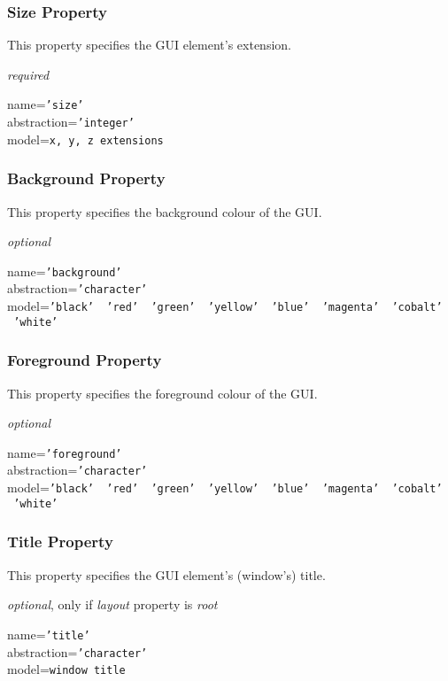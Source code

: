 \subsubsection{Size Property}

This property specifies the GUI element's extension.

\emph{required}

name=\texttt{'size'}\\
abstraction=\texttt{'integer'}\\
model=\texttt{x, y, z extensions}

\subsubsection{Background Property}

This property specifies the background colour of the GUI.

\emph{optional}

name=\texttt{'background'}\\
abstraction=\texttt{'character'}\\
model=\texttt{'black' \vline\ 'red' \vline\ 'green' \vline\ 'yellow' \vline\ 'blue' \vline\ 'magenta' \vline\ 'cobalt' \vline\ 'white'}

\subsubsection{Foreground Property}

This property specifies the foreground colour of the GUI.

\emph{optional}

name=\texttt{'foreground'}\\
abstraction=\texttt{'character'}\\
model=\texttt{'black' \vline\ 'red' \vline\ 'green' \vline\ 'yellow' \vline\ 'blue' \vline\ 'magenta' \vline\ 'cobalt' \vline\ 'white'}

\subsubsection{Title Property}

This property specifies the GUI element's (window's) title.

\emph{optional}, only if \emph{layout} property is \emph{root}

name=\texttt{'title'}\\
abstraction=\texttt{'character'}\\
model=\texttt{window title}

